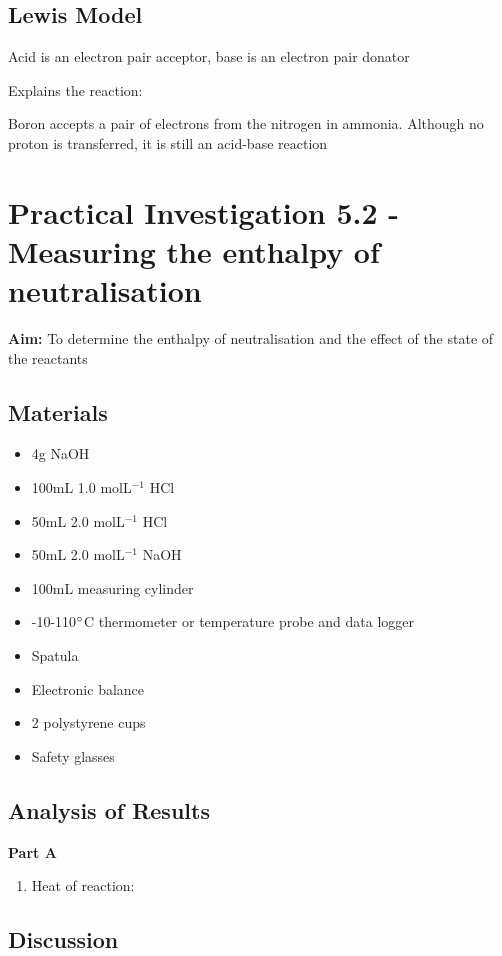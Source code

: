 	\subsection{Lewis Model}
		Acid is an electron pair acceptor, base is an electron pair donator
		
		Explains the  reaction:

		Boron accepts a pair of electrons from the nitrogen in ammonia. Although no proton is transferred, it is still an acid-base reaction

\section{Practical Investigation 5.2 - Measuring the enthalpy of neutralisation} \label{13/02/2025}
	\textbf{Aim:} To determine the enthalpy of neutralisation and the effect of the state of the reactants

	\subsection{Materials}
		\begin{itemize}
			\item 4g NaOH
			\item 100mL 1.0 molL$^{-1}$ HCl
			\item 50mL 2.0 molL$^{-1}$ HCl
			\item 50mL 2.0 molL$^{-1}$ NaOH
			\item 100mL measuring cylinder
			\item -10-110$\degree$C thermometer or temperature probe and data logger
			\item Spatula
			\item Electronic balance
			\item 2 polystyrene cups
			\item Safety glasses
		\end{itemize}

	\subsection{Analysis of Results}
		\textbf{Part A}
		\begin{enumerate}
			\item Heat of reaction:
		\end{enumerate}
	\subsection{Discussion}


